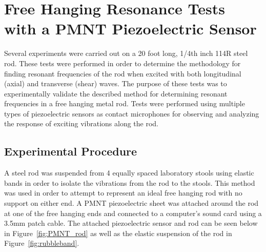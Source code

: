 \section{Free Hanging Resonance Tests with a PMNT Piezoelectric Sensor}

Several experiments were carried out on a 20 foot long, 1/4th inch 114R steel rod. These tests were performed in order to determine the methodology for finding resonant frequencies of the rod when excited with both longitudinal (axial) and transverse (shear) waves. The purpose of these tests was to experimentally validate the described method for determining resonant frequencies in a free hanging metal rod. Tests were performed using multiple types of piezoelectric sensors as contact microphones for observing and analyzing the response of exciting vibrations along the rod. 

\subsection{Experimental Procedure}

A steel rod was suspended from 4 equally spaced laboratory stools using elastic bands in order to isolate the vibrations from the rod to the stools. This method was used in order to attempt to represent an ideal free hanging rod with no support on either end. A PMNT piezoelectric sheet was attached around the rod at one of the free hanging ends and connected to a computer’s sound card using a 3.5mm patch cable. The attached piezoelectric sensor and rod can be seen below in Figure~\ref{fig:PMNT_rod} as well as the elastic suspension of the rod in Figure~\ref{fig:rubbleband}.

